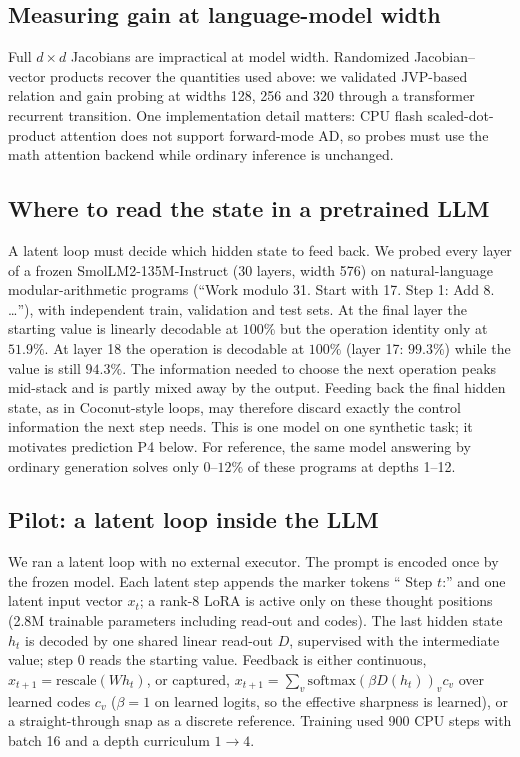 \documentclass[11pt]{article}
\theoremstyle{definition}
\theoremstyle{remark}
\begin{document}
\subsection{Measuring gain at language-model width}

Full $d\times d$ Jacobians are impractical at model width. Randomized Jacobian--vector products
recover the quantities used above: we validated JVP-based relation and gain probing at widths
128, 256 and 320 through a transformer recurrent transition. One implementation detail matters:
CPU flash scaled-dot-product attention does not support forward-mode AD, so probes must use the
math attention backend while ordinary inference is unchanged.

\subsection{Where to read the state in a pretrained LLM}\label{sec:probe}

A latent loop must decide which hidden state to feed back. We probed every layer of a frozen
SmolLM2-135M-Instruct (30 layers, width 576) on natural-language modular-arithmetic programs
(``Work modulo 31. Start with 17. Step 1: Add 8. \dots''), with independent train, validation
and test sets. At the final layer the starting value is linearly decodable at $100\%$ but the
operation identity only at $51.9\%$. At layer 18 the operation is decodable at $100\%$ (layer 17:
$99.3\%$) while the value is still $94.3\%$. The information needed to choose the next operation
peaks mid-stack and is partly mixed away by the output. Feeding back the final hidden state, as
in Coconut-style loops, may therefore discard exactly the control information the next step
needs. This is one model on one synthetic task; it motivates prediction P4 below. For reference,
the same model answering by ordinary generation solves only $0$--$12\%$ of these programs at
depths 1--12.

\subsection{Pilot: a latent loop inside the LLM}

We ran a latent loop with no external executor. The prompt is encoded once by the frozen model.
Each latent step appends the marker tokens `` Step $t$:'' and one latent input vector $x_t$; a
rank-8 LoRA is active only on these thought positions (2.8M trainable parameters including
read-out and codes). The last hidden state
$h_t$ is decoded by one shared linear read-out $D$, supervised with the intermediate value; step 0
reads the starting value. Feedback is either continuous, $x_{t+1}=\mathrm{rescale}(Wh_t)$, or
captured, $x_{t+1}=\sum_v\mathrm{softmax}(\beta D(h_t))_vc_v$ over learned codes $c_v$ ($\beta=1$ on
learned logits, so the effective sharpness is learned), or a
straight-through snap as a discrete reference. Training used 900 CPU steps with batch 16 and a depth
curriculum $1\to4$.
\end{document}
